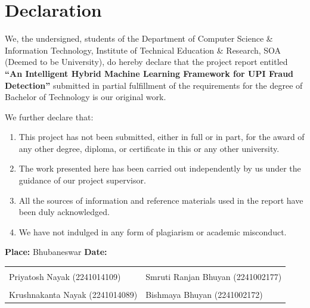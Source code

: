 \chapter*{Declaration}
\thispagestyle{plain}

\vspace{0.3in}

We, the undersigned, students of the Department of Computer Science \& Information Technology, Institute of Technical Education \& Research, SOA (Deemed to be University), do hereby declare that the project report entitled \textbf{``An Intelligent Hybrid Machine Learning Framework for UPI Fraud Detection''} submitted in partial fulfillment of the requirements for the degree of Bachelor of Technology is our original work.

\vspace{0.2in}

\noindent We further declare that:

\begin{enumerate}
    \item This project has not been submitted, either in full or in part, for the award of any other degree, diploma, or certificate in this or any other university.
    \item The work presented here has been carried out independently by us under the guidance of our project supervisor.
    \item All the sources of information and reference materials used in the report have been duly acknowledged.
    \item We have not indulged in any form of plagiarism or academic misconduct.
\end{enumerate}

\vspace{0.6in}

\noindent\textbf{Place:} Bhubaneswar \hfill \textbf{Date:} \underline{\hspace{3.5cm}}

\vspace{0.6in}

\noindent
\begin{tabular}{p{}p{}}
\underline{\hspace{5cm}} & \underline{\hspace{5cm}}\\
Priyatosh Nayak (2241014109) & Smruti Ranjan Bhuyan (2241002177)\\[0.6in]
\underline{\hspace{5cm}} & \underline{\hspace{5cm}}\\
Krushnakanta Nayak (2241014089) & Bishmaya Bhuyan (2241002172)\\
\end{tabular}
